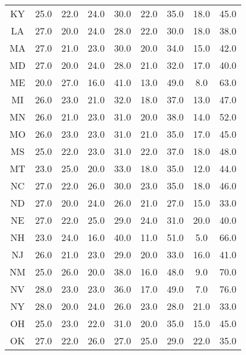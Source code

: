 \begin{table}
\begin{tabular}{ccccccccc}
   KY &     25.0 &   22.0 &      24.0 &    30.0 &      22.0 &    35.0 &      18.0 &    45.0 \\
   LA &     27.0 &   20.0 &      24.0 &    28.0 &      22.0 &    30.0 &      18.0 &    38.0 \\
   MA &     27.0 &   21.0 &      23.0 &    30.0 &      20.0 &    34.0 &      15.0 &    42.0 \\
   MD &     27.0 &   20.0 &      24.0 &    28.0 &      21.0 &    32.0 &      17.0 &    40.0 \\
   ME &     20.0 &   27.0 &      16.0 &    41.0 &      13.0 &    49.0 &       8.0 &    63.0 \\
   MI &     26.0 &   23.0 &      21.0 &    32.0 &      18.0 &    37.0 &      13.0 &    47.0 \\
   MN &     26.0 &   21.0 &      23.0 &    31.0 &      20.0 &    38.0 &      14.0 &    52.0 \\
   MO &     26.0 &   23.0 &      23.0 &    31.0 &      21.0 &    35.0 &      17.0 &    45.0 \\
   MS &     25.0 &   22.0 &      23.0 &    31.0 &      22.0 &    37.0 &      18.0 &    48.0 \\
   MT &     23.0 &   25.0 &      20.0 &    33.0 &      18.0 &    35.0 &      12.0 &    44.0 \\
   NC &     27.0 &   22.0 &      26.0 &    30.0 &      23.0 &    35.0 &      18.0 &    46.0 \\
   ND &     27.0 &   20.0 &      24.0 &    26.0 &      21.0 &    27.0 &      15.0 &    33.0 \\
   NE &     27.0 &   22.0 &      25.0 &    29.0 &      24.0 &    31.0 &      20.0 &    40.0 \\
   NH &     23.0 &   24.0 &      16.0 &    40.0 &      11.0 &    51.0 &       5.0 &    66.0 \\
   NJ &     26.0 &   21.0 &      23.0 &    29.0 &      20.0 &    33.0 &      16.0 &    41.0 \\
   NM &     25.0 &   26.0 &      20.0 &    38.0 &      16.0 &    48.0 &       9.0 &    70.0 \\
   NV &     28.0 &   23.0 &      23.0 &    36.0 &      17.0 &    49.0 &       7.0 &    76.0 \\
   NY &     28.0 &   20.0 &      24.0 &    26.0 &      23.0 &    28.0 &      21.0 &    33.0 \\
   OH &     25.0 &   23.0 &      22.0 &    31.0 &      20.0 &    35.0 &      15.0 &    45.0 \\
   OK &     27.0 &   22.0 &      26.0 &    27.0 &      25.0 &    29.0 &      22.0 &    35.0 \\

\end{tabular}
\end{table}
